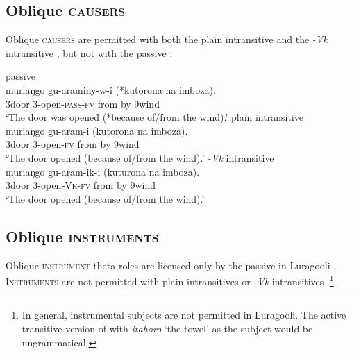 \documentclass[output=paper]{langsci/lanmgscibook}
\begin{document}
\subsection{Oblique \textsc{causers}}

Oblique \textsc{causers} are permitted with both the plain intransitive  and the \textit{-Vk} intransitive , but not with the passive :

\ea\label{ex:gluckman:8} 
  \ea\label{ex:gluckman:8a} 
  {{passive}}\\
  \gll muriaŋgo gu-araminy-w-i  (*kutorona na imboza).\\
      3door 3-open-\textsc{pass}-\textsc{fv}      from   by 9wind\\
  \glt ‘The door was opened (*because of/from the wind).’
  \ex\label{ex:gluckman:8b} 
  { {plain intransitive}}\\
  \gll muriaŋgo gu-aram-i (kutorona na imboza).\\
      3door 3-open-\textsc{fv}    from by 9wind\\
  \glt ‘The door opened (because of/from the wind).’
  \ex\label{ex:gluckman:8c} 
  { {\textit{-Vk}} {intransitive}}\\
  \gll muriaŋgo gu-aram-ik-i    (kuturona na imboza).\\
      3door       3-open\textit{-}\textsc{Vk}-\textsc{fv}   from       by 9wind\\
  \glt ‘The door opened (because of/from the wind).’
  \z
\z

\subsection{Oblique \textsc{instruments}}

Oblique \textsc{instrument} theta-roles are licensed only by the passive in Luragooli . \textsc{Instruments} are not permitted with plain intransitives  or \textit{-Vk} intransitives .\footnote{In general, instrumental subjects are not permitted in Luragooli. The active transitive version of  with \textit{itahoro} ‘the towel’ as the subject would be ungrammatical.}
\end{document}
